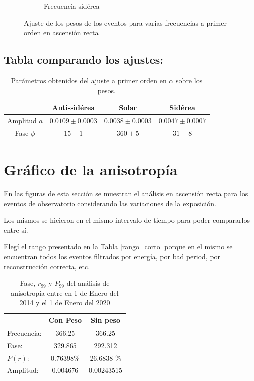 \begin{figure}[H]
\begin{subfigure}{.5\textwidth}
			\caption{Frecuencia sidérea}
			\label{fig:ajuste_siderea}
		\end{subfigure}%
		\caption{Ajuste de los pesos de los eventos para varias frecuencias a primer orden en ascensión recta}
		\end{figure}
		
	
\subsection{Tabla comparando los ajustes:}
		
		\begin{table}[H]
		\centering
		\begin{tabular}{c|c|c|c}
					& Anti-sidérea			& Solar 				& Sidérea\\ \hline
		Amplitud $a$& $0.0109\pm 0.0003 $ 	&	$0.0038 \pm 0.0003$	&  $0.0047\pm 0.0007$		\\
		Fase $\phi$ & $15    \pm 1$ 		&   $360 \pm 5   $ 		&  $31    \pm 8    $ 		\\
		\end{tabular}
		\caption{Parámetros obtenidos del ajuste a primer orden en $\alpha$ sobre los pesos.}
		\end{table}


\section{Gráfico de la anisotropía}

 En las figuras de esta sección se muestran el análisis en ascensión recta para los eventos de observatorio considerando las variaciones de la exposición.

 Los mismos se hicieron en el mismo intervalo de tiempo para poder compararlos entre sí. 
 
 				Elegí el rango presentado en la Tabla \ref{rango_corto}  porque en el mismo se encuentran todos los eventos filtrados por energía, por bad period, por reconstrucción correcta, etc.



\begin{table}[H]
\centering
\begin{tabular}{l|c|c}
				& Con Peso 	& Sin peso 		\\ \hline
Frecuencia:		& 366.25 	& 366.25 		\\
Fase:			& 329.865 	& 292.312		\\
$P(r)$:			& 0.76398\%	& 26.6838 \% 	\\
Amplitud:		& 0.004676 	& 0.00243515	\\
\end{tabular}
\caption{Fase, $r_{99}$ y $P_{99}$ del análisis de anisotropía entre en 1 de Enero del 2014 y el 1 de Enero del 2020}
\end{table}



